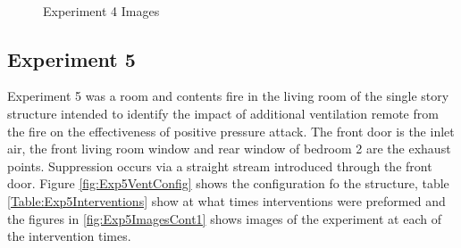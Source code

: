 \documentclass{article}
\begin{document}
\begin{figure}[H]
	\ContinuedFloat 
	\centering 
	 \ 
	 \ 
	 \ 
	\caption{Experiment 4 Images}
	\label{fig:Experiment4ImagesCont3} 
\end{figure}

\subsection{Experiment 5}
Experiment 5 was a room and contents fire in the living room of the single story structure intended to identify the impact of additional ventilation remote from the fire on the effectiveness of positive pressure attack. The front door is the inlet air, the front living room window and rear window of bedroom 2 are the exhaust points. Suppression occurs via a straight stream introduced through the front door. Figure \ref{fig:Exp5VentConfig} shows the configuration fo the structure, table \ref{Table:Exp5Interventions} show at what times interventions were preformed and the figures in \ref{fig:Exp5ImagesCont1} shows images of the experiment at each of the intervention times.
\end{document}
